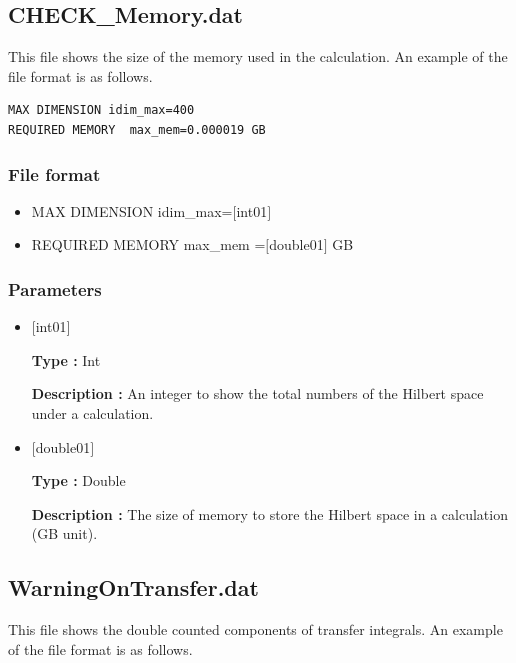 \newpage
\subsection{CHECK\_Memory.dat}
This file shows the size of the memory used in the calculation.
An example of the file format is as follows.

\begin{minipage}{12.5cm}
\begin{screen}
\begin{verbatim}
MAX DIMENSION idim_max=400 
REQUIRED MEMORY  max_mem=0.000019 GB 
\end{verbatim}
\end{screen}
\end{minipage}

\subsubsection{File format}
 \begin{itemize}
   \item  MAX DIMENSION idim\_max=$[$int01$]$
   \item  REQUIRED MEMORY  max\_mem =$[$double01$]$ GB 
 \end{itemize}
 
\subsubsection{Parameters}
 \begin{itemize}

    \item  $[$int01$]$ 
   
    {\bf Type :} Int

   {\bf Description :} An integer to show the total numbers of the Hilbert space under a calculation.
      
   \item  $[$double01$]$
   
    {\bf Type :} Double

    {\bf Description :}  
    The size of memory to store the Hilbert space in a calculation (GB unit).
 
\end{itemize}

\newpage
\subsection{WarningOnTransfer.dat}
This file shows the double counted components of transfer integrals.
An example of the file format is as follows.

